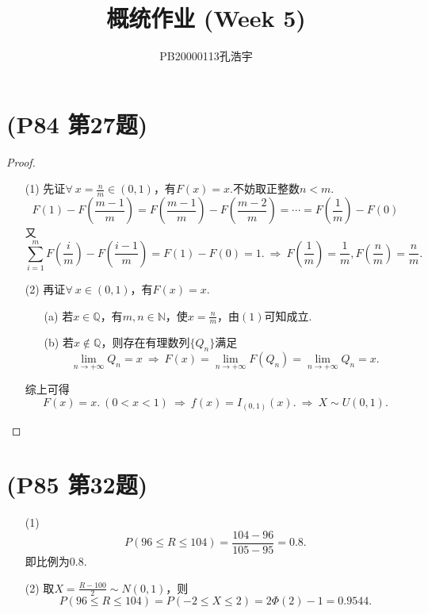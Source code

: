 \documentclass{article}
\title{概统作业 (Week 5)}
\author{PB20000113孔浩宇}
\begin{document}
\maketitle
\section{(P84 第27题)}  %
\begin{proof}
    \begin{enumerate}
        \item []
        \item [(1)]先证$\forall\ x=\frac{n}{m} \in (0,1)$，有$F(x)=x$.不妨取正整数$n<m$.
        \[
            F(1)-F(\frac{m-1}{m})=F(\frac{m-1}{m})-F(\frac{m-2}{m})=\cdots
            =F(\frac{1}{m}) - F(0)    
        \]
        又
        \[
            \sum\limits_{i=1}^{m} F(\frac{i}{m})-F(\frac{i-1}{m})
            =F(1)-F(0)=1 .
            \ \Rightarrow\ 
            F(\frac{1}{m})=\frac{1}{m} , F(\frac{n}{m})=\frac{n}{m}. 
        \]
        \item [(2)]再证$\forall\ x\in (0,1)$，有$F(x)=x$.
        \begin{enumerate}
            \item [(a)]若$x\in \mathbb{Q}$，有$m,n\in \mathbb{N}$，使$x=\frac{n}{m}$，由$(1)$可知成立.
            \item [(b)]若$x\notin \mathbb{Q}$，则存在有理数列$\{Q_n\}$满足
            \[
                \lim\limits_{n\to +\infty} Q_n = x
                \ \Rightarrow\ 
                F(x)
                = \lim\limits_{n\to +\infty} F(Q_n) 
                = \lim\limits_{n\to +\infty} Q_n
                = x.
            \]
        \end{enumerate}
        综上可得
        \[
            F(x)=x.\ (0<x<1)
            \ \Rightarrow\ 
            f(x)= I_{(0,1)}(x).
            \ \Rightarrow\ 
            X\sim U(0,1).
        \]
    \end{enumerate}
\end{proof}

\section{(P85 第32题)}  %
\begin{enumerate}
    \item [(1)]
    \[
        P(96\leq R \leq 104)=
        \frac{104-96}{105-95}=0.8 . 
    \]
    即比例为$0.8$.
    \item [(2)]取$X=\frac{R-100}{2} \sim N(0,1)$，则
    \[
        P(96\leq R \leq 104)=
        P(-2\leq X \leq 2)=
        2\Phi(2) -1=
        0.9544.
    \]
\end{enumerate}
\end{document}
